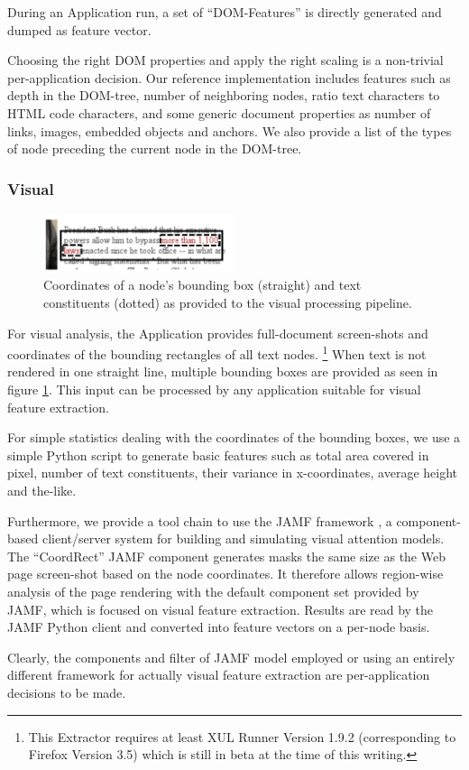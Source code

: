 During an Application run, a set of ``DOM-Features'' is directly generated and dumped as feature vector.

Choosing the right DOM properties and apply the right scaling is a non-trivial per-application decision.
Our reference implementation includes features such as depth in the DOM-tree, number of neighboring nodes, ratio text characters to HTML code characters,
  and some generic document properties as number of links, images, embedded objects and anchors.
We also provide a list of the types of node preceding the current node in the DOM-tree.


\subsubsection{Visual}

\begin{figure}
\includegraphics[width=0.5\textwidth]{vizwrap}
\caption{\label{f:vizwrap}Coordinates of a node's bounding box (straight) and text constituents (dotted) as provided to the visual processing pipeline.}
\end{figure}

For visual analysis, the Application provides full-document screen-shots and coordinates of the bounding rectangles of all text nodes.%
\footnote{This Extractor requires at least XUL Runner Version 1.9.2 (corresponding to Firefox Version 3.5) which is still in beta at the time of this writing.}
When text is not rendered in one straight line, multiple bounding boxes are provided as seen in figure \ref{f:vizwrap}.
This input can be processed by any application suitable for visual feature extraction.

For simple statistics dealing with the coordinates of the bounding boxes, we use a simple Python script to generate basic features such as total area covered in pixel, number of text constituents, their variance in x-coordinates, average height and the-like.

Furthermore, we provide a tool chain to use the JAMF framework \cite{Steger08}, a component-based client/server system for building and simulating visual attention models.
The ``CoordRect'' JAMF component generates masks the same size as the Web page screen-shot based on the node coordinates.
It therefore allows region-wise analysis of the page rendering with the default component set provided by JAMF, which is focused on visual feature extraction.
Results are read by the JAMF Python client and converted into feature vectors on a per-node basis.

Clearly, the components and filter of JAMF model employed or using an entirely different framework for actually visual feature extraction are per-application decisions to be made.


